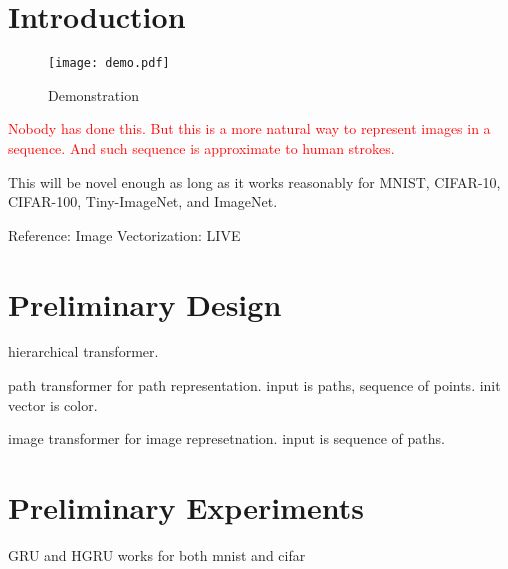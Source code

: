 \documentclass[10pt,twocolumn,letterpaper]{article}
\begin{document}
\section{Introduction}
\label{sec:intro}

\begin{figure}[t]
    \texttt{[image: demo.pdf]}
    \caption{Demonstration}
\end{figure}

\textcolor{red}{Nobody has done this. But this is a more natural way to represent images in a sequence. 
And such sequence is approximate to human strokes.}

This will be novel enough as long as it works reasonably for MNIST, CIFAR-10,
CIFAR-100, Tiny-ImageNet, and ImageNet.

Reference: Image Vectorization: LIVE \cite{live}

\section{Preliminary Design}

hierarchical transformer.

path transformer for path representation. input is paths, sequence of points. init vector is color.

image transformer for image represetnation. input is sequence of paths.

\section{Preliminary Experiments}

GRU and HGRU works for both mnist and cifar
\end{document}
